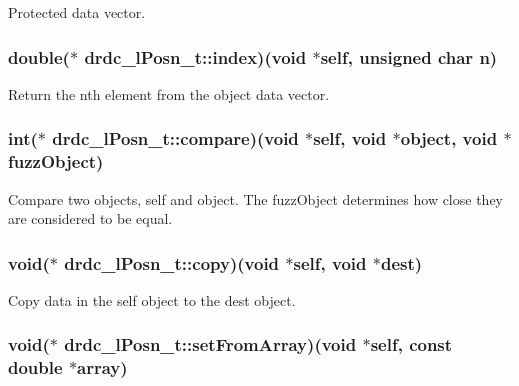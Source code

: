 Protected data vector. 

\hypertarget{structdrdc__lPosn__t_4c1c722c6bcf89c94d0d79f912e6a8fc}{
\subsubsection[index]{\setlength{\rightskip}{0pt plus 5cm}double($\ast$ {\bf drdc\_\-lPosn\_\-t::index})(void $\ast$self, unsigned char n)}}
\label{structdrdc__lPosn__t_4c1c722c6bcf89c94d0d79f912e6a8fc}


Return the nth element from the object data vector. 

\hypertarget{structdrdc__lPosn__t_c96fa0e4a4865314fe8eb3d084146ec2}{
\subsubsection[compare]{\setlength{\rightskip}{0pt plus 5cm}int($\ast$ {\bf drdc\_\-lPosn\_\-t::compare})(void $\ast$self, void $\ast$object, void $\ast$fuzzObject)}}
\label{structdrdc__lPosn__t_c96fa0e4a4865314fe8eb3d084146ec2}


Compare two objects, self and object. The fuzzObject determines how close they are considered to be equal. 

\hypertarget{structdrdc__lPosn__t_2bbf1f6e34cb3e050387f0c7564481d3}{
\subsubsection[copy]{\setlength{\rightskip}{0pt plus 5cm}void($\ast$ {\bf drdc\_\-lPosn\_\-t::copy})(void $\ast$self, void $\ast$dest)}}
\label{structdrdc__lPosn__t_2bbf1f6e34cb3e050387f0c7564481d3}


Copy data in the self object to the dest object. 

\hypertarget{structdrdc__lPosn__t_5381388dc9938ffd0d7be23e120ba160}{
\subsubsection[setFromArray]{\setlength{\rightskip}{0pt plus 5cm}void($\ast$ {\bf drdc\_\-lPosn\_\-t::setFromArray})(void $\ast$self, const double $\ast$array)}}
\label{structdrdc__lPosn__t_5381388dc9938ffd0d7be23e120ba160}


